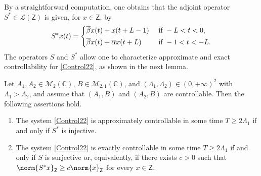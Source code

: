 By a straightforward computation, one obtains that the adjoint operator $S^\ast \in \mathcal L(\mathsf Z)$ is given, for $x \in \mathsf Z$, by
\begin{equation}
\label{SAst}
S^\ast x(t) =
\begin{dcases}
\overline\beta x(t) + x(t + L - 1) & \text{ if } -L < t < 0, \\
\overline\beta x(t) + \overline\alpha x(t + L) & \text{ if } -1 < t < -L.
\end{dcases}
\end{equation}
The operators $S$ and $S^\ast$ allow one to characterize approximate and exact controllability for \eqref{Control22}, as shown in the next lemma.

\begin{lemm}
\label{LemmS}
Let $A_1, A_2 \in \mathcal M_2(\mathbb C)$, $B \in \mathcal M_{2, 1}(\mathbb C)$, and $(\Lambda_1, \Lambda_2) \in (0, +\infty)^2$ with $\Lambda_1 > \Lambda_2$, and assume that $(A_1, B)$ and $(A_2, B)$ are controllable. Then the following assertions hold.
\begin{enumerate}
\item\label{Syst22SInj} The system \eqref{Control22} is approximately controllable in some time $T \geq 2 \Lambda_1$ if and only if $S^\ast$ is injective.

\item\label{Syst22SAstSurj} The system \eqref{Control22} is exactly controllable in some time $T \geq 2 \Lambda_1$ if and only if $S$ is surjective or, equivalently, if there exists $c > 0$ such that $\norm{S^\ast x}_{\mathsf Z} \geq c \norm{x}_{\mathsf Z}$ for every $x \in \mathsf Z$.
\end{enumerate}
\end{lemm}

